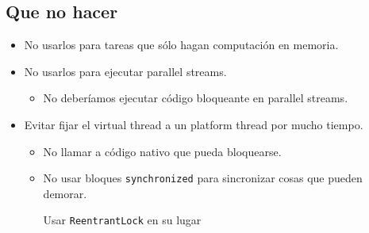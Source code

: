 \documentclass{presentacion}
\begin{document}
\subsection{Que no hacer}
\begin{frame}
 \begin{itemize}[<+->]
    \item No usarlos para tareas que sólo hagan computación en memoria.
    \item No usarlos para ejecutar parallel streams.
    \begin{itemize}
        \item No deberíamos ejecutar código bloqueante en parallel streams.
    \end{itemize}
    \item Evitar fijar el virtual thread a un platform thread por mucho tiempo.
    \begin{itemize}
        \item No llamar a código nativo que pueda bloquearse.
        \item No usar bloques \texttt{synchronized} para sincronizar cosas que pueden demorar.
       
             Usar \texttt{ReentrantLock} en su lugar
    \end{itemize}

 \end{itemize}
\end{frame}
\end{document}
